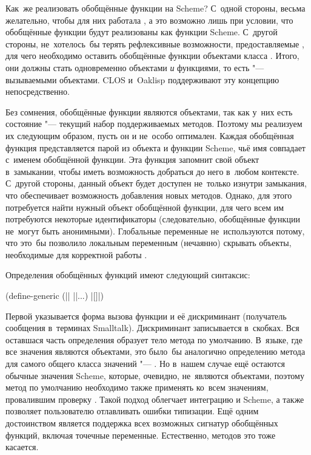 Как~же реализовать обобщённые функции на Scheme? С~одной стороны, весьма
желательно, чтобы для них работала , а это возможно лишь при условии,
что обобщённые функции будут реализованы как функции Scheme. С~другой стороны,
не~хотелось~бы терять рефлексивные возможности, предоставляемые {\Meroonet},
для чего необходимо оставить обобщённые функции объектами класса .
Итого, они должны стать одновременно объектами \emph{и} функциями, то есть
 "--- вызываемыми объектами. CLOS и~Oaklisp \cite{lp86,lp88}
поддерживают эту концепцию непосредственно.

Без сомнения, обобщённые функции являются объектами, так как у~них есть
состояние "--- текущий набор поддерживаемых методов. Поэтому мы реализуем их
следующим образом, пусть он и не~особо оптимален. Каждая обобщённая функция
представляется парой из объекта {\Meroonet} и функции Scheme, чьё имя совпадает
с~именем обобщённой функции. Эта функция запомнит свой объект в~замыкании, чтобы
иметь возможность добраться до него в~любом контексте. С~другой стороны,
данный объект будет доступен не~только изнутри замыкания, что обеспечивает
возможность добавления новых методов. Однако, для этого потребуется найти нужный
объект обобщённой функции, для чего всем им потребуются некоторые идентификаторы
(следовательно, обобщённые функции не~могут быть анонимными). Глобальные
переменные не~используются потому, что это~бы позволило локальным переменным
(нечаянно) скрывать объекты, необходимые для корректной работы {\Meroonet}.


Определения обобщённых функций имеют следующий синтаксис:

\begin{code:lisp}
(define-generic (|| ||...) |$[$$]$|)
\end{code:lisp}

\noindent
Первой указывается форма вызова функции и её дискриминант (получатель сообщения
в~терминах Smalltalk). Дискриминант записывается в~скобках. Вся оставшася часть
определения образует тело метода по умолчанию. В~языке, где все значения
являются объектами, это было~бы аналогично определению метода для самого общего
класса значений "--- . Но в~нашем случае ещё остаются обычные
значения Scheme, которые, очевидно, не~являются объектами, поэтому метод по
умолчанию необходимо также применять ко~всем значениям, провалившим проверку
. Такой подход облегчает интеграцию {\Meroonet} и Scheme, а также
позволяет пользователю отлавливать ошибки типизации. Ещё одним достоинством
{\Meroonet} является поддержка всех возможных сигнатур обобщённых функций,
включая точечные переменные. Естественно, методов это тоже касается.


